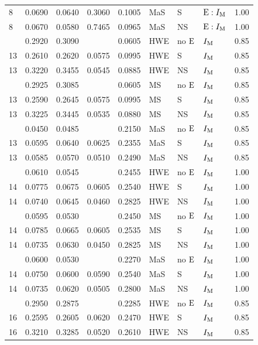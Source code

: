 \begin{longtable}[t]{lllllllll}
8 & 0.0690 & 0.0640 & 0.3060 & 0.1005 & MaS & S & ${\rm E}:I_{{\rm M}}$ & 1.00\\
8 & 0.0670 & 0.0580 & 0.7465 & 0.0965 & MaS & NS & ${\rm E}:I_{{\rm M}}$ & 1.00\\
\addlinespace
13 & 0.2920 & 0.3090 &  & 0.0605 & HWE & no ${\rm E}$ & $I_{{\rm M}}$ & 0.85\\
13 & 0.2610 & 0.2620 & 0.0575 & 0.0995 & HWE & S & $I_{{\rm M}}$ & 0.85\\
13 & 0.3220 & 0.3455 & 0.0545 & 0.0885 & HWE & NS & $I_{{\rm M}}$ & 0.85\\
\addlinespace
13 & 0.2925 & 0.3085 &  & 0.0605 & MS & no ${\rm E}$ & $I_{{\rm M}}$ & 0.85\\
13 & 0.2590 & 0.2645 & 0.0575 & 0.0995 & MS & S & $I_{{\rm M}}$ & 0.85\\
13 & 0.3225 & 0.3445 & 0.0535 & 0.0880 & MS & NS & $I_{{\rm M}}$ & 0.85\\
\addlinespace
13 & 0.0450 & 0.0485 &  & 0.2150 & MaS & no ${\rm E}$ & $I_{{\rm M}}$ & 0.85\\
13 & 0.0595 & 0.0640 & 0.0625 & 0.2355 & MaS & S & $I_{{\rm M}}$ & 0.85\\
13 & 0.0585 & 0.0570 & 0.0510 & 0.2490 & MaS & NS & $I_{{\rm M}}$ & 0.85\\
\addlinespace
14 & 0.0610 & 0.0545 &  & 0.2455 & HWE & no ${\rm E}$ & $I_{{\rm M}}$ & 1.00\\
14 & 0.0775 & 0.0675 & 0.0605 & 0.2540 & HWE & S & $I_{{\rm M}}$ & 1.00\\
14 & 0.0740 & 0.0645 & 0.0460 & 0.2825 & HWE & NS & $I_{{\rm M}}$ & 1.00\\
\addlinespace
14 & 0.0595 & 0.0530 &  & 0.2450 & MS & no ${\rm E}$ & $I_{{\rm M}}$ & 1.00\\
14 & 0.0785 & 0.0665 & 0.0605 & 0.2535 & MS & S & $I_{{\rm M}}$ & 1.00\\
14 & 0.0735 & 0.0630 & 0.0450 & 0.2825 & MS & NS & $I_{{\rm M}}$ & 1.00\\
\addlinespace
14 & 0.0600 & 0.0530 &  & 0.2270 & MaS & no ${\rm E}$ & $I_{{\rm M}}$ & 1.00\\
14 & 0.0750 & 0.0600 & 0.0590 & 0.2540 & MaS & S & $I_{{\rm M}}$ & 1.00\\
14 & 0.0735 & 0.0620 & 0.0505 & 0.2800 & MaS & NS & $I_{{\rm M}}$ & 1.00\\
\addlinespace
16 & 0.2950 & 0.2875 &  & 0.2285 & HWE & no ${\rm E}$ & $I_{{\rm M}}$ & 0.85\\
16 & 0.2595 & 0.2605 & 0.0620 & 0.2470 & HWE & S & $I_{{\rm M}}$ & 0.85\\
16 & 0.3210 & 0.3285 & 0.0520 & 0.2610 & HWE & NS & $I_{{\rm M}}$ & 0.85\\

\end{longtable}
